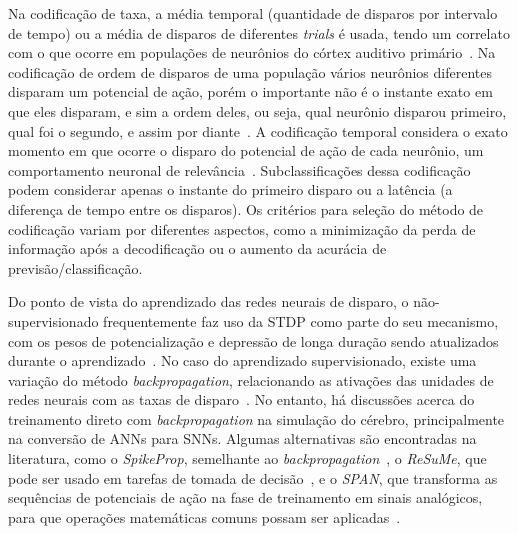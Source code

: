 Na codificação de taxa, a média temporal (quantidade de disparos por intervalo de tempo) ou a média de disparos de diferentes \textit{trials} é usada, tendo um correlato com o que ocorre em populações de neurônios do córtex auditivo primário~\cite{decharms_primary_1996}. Na codificação de ordem de disparos de uma população vários neurônios diferentes disparam um potencial de ação, porém o importante não é o instante exato em que eles disparam, e sim a ordem deles, ou seja, qual neurônio disparou primeiro, qual foi o segundo, e assim por diante~\cite{mallot_coding_2013}. A codificação temporal considera o exato momento em que ocorre o disparo do potencial de ação de cada neurônio, um comportamento neuronal de relevância~\cite{bohte_evidence_2004}. Subclassificações dessa codificação podem considerar apenas o instante do primeiro disparo ou a latência (a diferença de tempo entre os disparos). Os critérios para seleção do método de codificação variam por diferentes aspectos, como a minimização da perda de informação após a decodificação ou o aumento da acurácia de previsão/classificação.

Do ponto de vista do aprendizado das redes neurais de disparo, o não-supervisionado frequentemente faz uso da STDP como parte do seu mecanismo, com os pesos de potencialização e depressão de longa duração sendo atualizados durante o aprendizado~\cite{kheradpisheh_stdp-based_2018}. No caso do aprendizado supervisionado, existe uma variação do método \textit{backpropagation}, relacionando as ativações das unidades de redes neurais com as taxas de disparo~\cite{diehl_fast-classifying_2015}. No entanto, há discussões acerca do treinamento direto com \textit{backpropagation} na simulação do cérebro, principalmente na conversão de ANNs para SNNs. Algumas alternativas são encontradas na literatura, como o \textit{SpikeProp}, semelhante ao \textit{backpropagation}~\cite{bohte_error-backpropagation_2002}, o \textit{ReSuMe}, que pode ser usado em tarefas de tomada de decisão~\cite{ponulak_supervised_2010}, e o \textit{SPAN}, que transforma as sequências de potenciais de ação na fase de treinamento em sinais analógicos, para que operações matemáticas comuns possam ser aplicadas~\cite{mohemmed_span_2012}.

